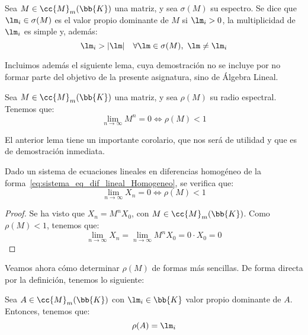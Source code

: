\begin{definicion}
    Sea $M\in \cc{M}_m(\bb{K})$ una matriz, y sea $\sigma(M)$ su espectro. Se dice que $\lm_i\in \sigma(M)$ es el valor propio dominante de $M$ si $\lm_i>0$, la multiplicidad de $\lm_i$ es simple y, además:
    \begin{equation*}
        \lm_i>|\lm|\quad \forall \lm\in \sigma(M),~\lm\neq \lm_i
    \end{equation*}
\end{definicion}

Incluimos además el siguiente lema, cuya demostración no se incluye por no formar parte del objetivo de la presente asignatura, sino de Álgebra Lineal.
\begin{lema}
    Sea $M\in \cc{M}_m(\bb{K})$ una matriz, y sea $\rho(M)$ su radio espectral. Tenemos que:
    \begin{equation*}
        \lim_{n\to \infty} M^n = 0 \Longleftrightarrow \rho(M)<1
    \end{equation*}
\end{lema}

El anterior lema tiene un importante corolario, que nos será de utilidad y que es de demostración inmediata.
\begin{coro}
    Dado un sistema de ecuaciones lineales en diferencias homogéneo  de la forma~\ref{eq:sistema_eq_dif_lineal_Homogeneo}, se verifica que:
    \begin{equation*}
        \lim_{n\to \infty}X_n = 0\Longleftrightarrow \rho(M)<1
    \end{equation*}
    \begin{proof}
        Se ha visto que $X_n=M^nX_0$, con $M\in \cc{M}_m(\bb{K})$. Como $\rho(M)<1$, tenemos que:
        \begin{equation*}
            \lim_{n\to \infty}X_n = \lim_{n\to \infty} M^nX_0 = 0\cdot X_0=0
        \end{equation*}
    \end{proof}
\end{coro}

Veamos ahora cómo determinar $\rho(M)$ de formas más sencillas. De forma directa por la definición, tenemos lo siguiente:
\begin{observacion}
    Sea $A\in \cc{M}_m(\bb{K})$ con $\lm_i\in \bb{K}$ valor propio dominante de $A$. Entonces, tenemos que:
    \begin{equation*}
        \rho(A)=\lm_i
    \end{equation*}
\end{observacion}

